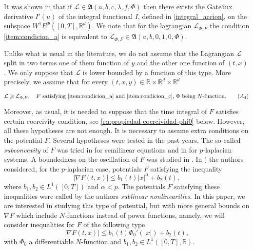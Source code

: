 \documentclass[twoside]{article}
\theoremstyle{remark}
\newcommand{\ephi}{E^{\Phi}}
\newcommand{\wphie}{W^{1}\ephi}
\newcommand{\rr}{\mathbb{R}}
\renewcommand{\leq}{\leqslant}
\renewcommand{\geq}{\geqslant}
\begin{document}
It was shown in
\cite{ABGMS2015} that if $\mathcal{L}\in \mathfrak{A}(a,b,c,\lambda,f,\Phi)$ then there  exists the Gate\^aux derivative $I'(u)$ of the integral functional $I$, defined in \eqref{integral_accion}, on the subspace $\wphie([0,T],\rr^d)$. We note that for the lagrangian $\mathcal{L}_{\Phi,F}$ the condition \ref{item:condicion_a} is equivalent to
$\mathcal{L}_{\Phi,F}\in \mathfrak{A}(a,b,0,1,0,\Phi)$.

 Unlike what is usual in the literature, we do not assume that the Lagrangian $\mathcal{L}$  split in two terms one of them function of $y$ and the other one function of $(t,x)$. 
We only suppose that $\mathcal{L}$ is lower bounded by a function of this type. More precisely, we assume that for every $(t,x,y)\in\rr\times\rr^d\times\rr^d$

\begin{equation}\label{eq:control_inf}
\mathcal{L} \geq \mathcal{L}_{\Phi,F},\quad F\text{ satisfying \ref{item:condicion_a} and \ref{item:condicion_c},  $\Phi$ being $N$-function}.\tag{$A_4$}
\end{equation}



Moreover, as usual, it is needed to suppose that the time integral of $F$ satisfies certain coercivity condition, see \eqref{eq:propiedad-coercividad-phi0} below.  However,  all these hypotheses are not enough. It is necessary to assume extra conditions on the potential $F$.
Several hypotheses were tested in the past years. The so-called \emph{subconvexity} of $F$ was tried in \cite{wu1999periodic,tang1995periodic,zhao2004periodic} for semilinear equations and in \cite{xu2007some,tang2010periodic} for $p$-laplacian systems. A boundedness on the oscillation of $F$ was studied in \cite{ABGMS2015}. In \cite{tang1998periodic, tang2010periodic}) the authors  considered, for the $p$-laplacian case, potentials $F$ satisfying the inequality
\begin{equation}\label{eq:cota_pot} |\nabla F(t,x)|\leq b_1(t)|x|^{\alpha}+b_2(t),
 \end{equation}
where  $b_1,b_2 \in L^1([0,T])$ and $\alpha<p$. The potentials $F$ satisfying these inequalities  were called by the authors \emph{sublinear nonlinearities}. In this paper, we are interested in studying this type of potential, but with more general bounds on $\nabla F$ which include $N$-functions instead of power functions, namely, we will consider inequalities for $F$ of the following type
\begin{equation}\label{holder_cont-mu}
  \left| \nabla F(t,x) \right|\leq b_1(t)\Phi_0'(|x|)+b_2(t),
  \tag{$A_6$}
\end{equation}
with $\Phi_0$  a differentiable $N$-function and $b_1,b_2 \in L^1([0,T],\rr)$.
\end{document}
